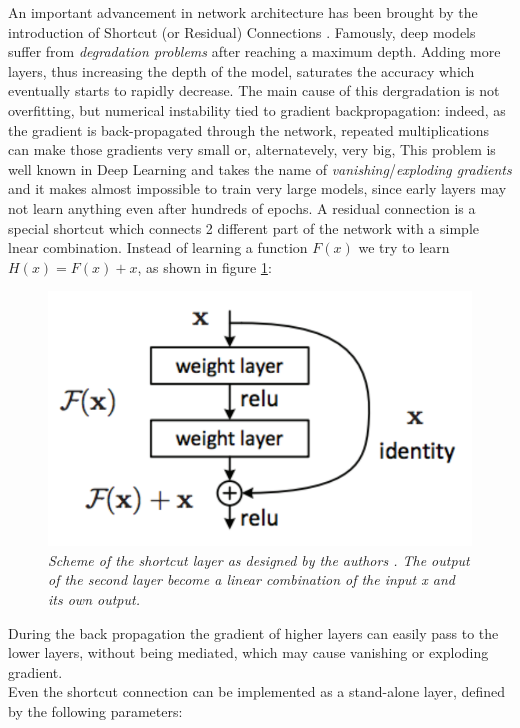 \documentclass[12pt,a4paper]{report}
\begin{document}
An important advancement in network architecture has been brought by the introduction of Shortcut (or Residual) Connections \cite{residual}. Famously, deep models suffer from {\it degradation problems} after reaching a maximum depth. Adding more layers, thus increasing the depth of the model, saturates the accuracy which eventually starts to rapidly decrease. 
The main cause of this dergradation is not overfitting, but numerical instability tied to gradient backpropagation: indeed, as the gradient is back-propagated through the network, repeated multiplications can make those gradients very small or, alternatevely, very big,
This problem is well known in Deep Learning and takes the name of {\it vanishing}/{\it exploding gradients} and it makes almost impossible to train very large models, since early layers may not learn anything even after hundreds of epochs.
A residual connection is a special shortcut which connects 2 different part of the network with a simple lnear combination.
Instead of learning a function $F(x)$ we try to learn $H(x) = F(x) + x$, as shown in figure \ref{fig:shortcut}:

\begin{figure}[h]
 \centering
 \includegraphics[scale=0.4]{./images/shortcut.png}
 \caption{\it Scheme of the shortcut layer as designed by the authors \cite{residual}. The output of the second layer become a linear combination of the input x and its own output.}
 \label{fig:shortcut}
\end{figure}
During the back propagation the gradient of higher layers can easily pass to the lower layers, without being mediated, which may cause vanishing or exploding gradient.
\\
Even the shortcut connection can be implemented as a stand-alone layer, defined by the following parameters:
\end{document}
